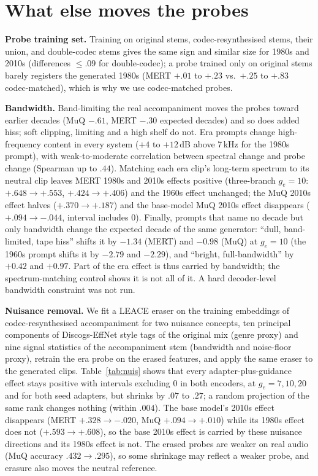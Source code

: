 \documentclass[10pt,twocolumn]{article}
\begin{document}
\section{What else moves the probes}
\textbf{Probe training set.} Training on original stems, codec-resynthesised stems, their union, and double-codec stems gives the same sign and similar size for 1980s and 2010s (differences $\leq.09$ for double-codec); a probe trained only on original stems barely registers the generated 1980s (MERT $+.01$ to $+.23$ vs.\ $+.25$ to $+.83$ codec-matched), which is why we use codec-matched probes.

\textbf{Bandwidth.} Band-limiting the real accompaniment moves the probes toward earlier decades (MuQ $-.61$, MERT $-.30$ expected decades) and so does added hiss; soft clipping, limiting and a high shelf do not. Era prompts change high-frequency content in every system ($+4$ to $+12$\,dB above 7\,kHz for the 1980s prompt), with weak-to-moderate correlation between spectral change and probe change (Spearman up to $.44$). Matching each era clip's long-term spectrum to its neutral clip leaves MERT 1980s and 2010s effects positive (three-branch $g_e{=}10$: $+.648\to+.553$, $+.424\to+.406$) and the 1960s effect unchanged; the MuQ 2010s effect halves ($+.370\to+.187$) and the base-model MuQ 2010s effect disappears ($+.094\to-.044$, interval includes 0). Finally, prompts that name no decade but only bandwidth change the expected decade of the same generator: ``dull, band-limited, tape hiss'' shifts it by $-1.34$ (MERT) and $-0.98$ (MuQ) at $g_e{=}10$ (the 1960s prompt shifts it by $-2.79$ and $-2.29$), and ``bright, full-bandwidth'' by $+0.42$ and $+0.97$. Part of the era effect is thus carried by bandwidth; the spectrum-matching control shows it is not all of it. A hard decoder-level bandwidth constraint was not run.

\textbf{Nuisance removal.} We fit a LEACE eraser on the training embeddings of codec-resynthesised accompaniment for two nuisance concepts, ten principal components of Discogs-EffNet style tags of the original mix (genre proxy) and nine signal statistics of the accompaniment stem (bandwidth and noise-floor proxy), retrain the era probe on the erased features, and apply the same eraser to the generated clips. Table~\ref{tab:nuis} shows that every adapter-plus-guidance effect stays positive with intervals excluding 0 in both encoders, at $g_e{=}7,10,20$ and for both seed adapters, but shrinks by $.07$ to $.27$; a random projection of the same rank changes nothing (within $.004$). The base model's 2010s effect disappears (MERT $+.328\to-.020$, MuQ $+.094\to+.010$) while its 1980s effect does not ($+.593\to+.608$), so the base 2010s effect is carried by these nuisance directions and its 1980s effect is not. The erased probes are weaker on real audio (MuQ accuracy $.432\to.295$), so some shrinkage may reflect a weaker probe, and erasure also moves the neutral reference.
\end{document}
